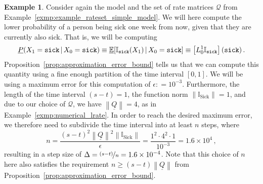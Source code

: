 \documentclass[10pt,a4paper]{paper}
\theoremstyle{definition}
\newtheorem{exmp}{Example}%
\newcommand{\ind}[1]{\mathbb{I}_{#1}}
\newcommand{\rateset}{\mathcal{Q}}
\newcommand{\lrate}{\underline{Q}}
\newcommand{\norm}[1]{\left\lVert #1 \right\rVert}
\newcommand{\coloneqq}{:\!=}
\begin{document}
\begin{exmp}\label{exmp:single_time_numerical}
Consider again the model and the set of rate matrices $\rateset$ from Example~\ref{exmp:example_rateset_simple_model}. We will here compute the lower probability of a person being sick one week from now, given that they are currently also sick. That is, we will be computing
\begin{equation*}
\underline{P}(X_1 = \text{{\tt sick}}\,\vert\,X_0=\text{{\tt sick}}) \equiv \underline{\mathbb{E}}[\ind{\text{{\tt sick}}}(X_1)\,\vert\,X_0=\text{{\tt sick}}] \equiv \left[L_0^1\ind{\text{{\tt sick}}}\right](\text{{\tt sick}})\,.
\end{equation*}
Proposition~\ref{prop:approximation_error_bound} tells us that we can compute this quantity using a fine enough partition of the time interval $[0,1]$. We will be using a maximum error for this computation of $\epsilon\coloneqq 10^{-3}$. Furthermore, the length of the time interval $(s-t)=1$, the function norm $\norm{\ind{\text{Sick}}}=1$, and due to our choice of $\rateset$, we have $\norm{\lrate} = 4$, as in Example~\ref{exmp:numerical_lrate}. In order to reach the desired maximum error, we therefore need to subdivide the time interval into at least $n$ steps, where
\begin{equation*}
n = \frac{(s-t)^2\norm{\lrate}^2\norm{\ind{\text{Sick}}}}{\epsilon} = \frac{1^2\cdot 4^2\cdot 1}{10^{-3}} = 1.6\times 10^4\,,
\end{equation*}
resulting in a step size of $\Delta=\nicefrac{(s-t)}{n}=1.6\times 10^{-4}$. Note that this choice of $n$ here also satisfies the requirement $n\geq (s-t)\norm{\lrate}$ from Proposition~\ref{prop:approximation_error_bound}. 


\end{exmp}
\end{document}

